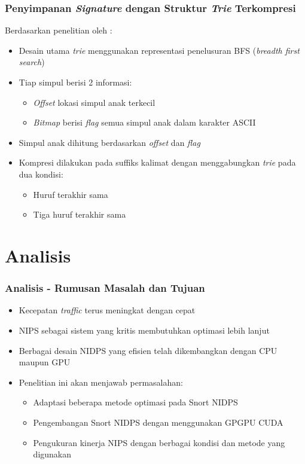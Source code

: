 \documentclass{beamer}
\begin{document}
  \begin{frame}
  \frametitle{Penyimpanan \emph{Signature} dengan Struktur \emph{Trie} Terkompresi}
    Berdasarkan penelitian oleh \cite{bellekens2014}:
    \begin{itemize}
      \item Desain utama \emph{trie} menggunakan representasi penelusuran BFS (\emph{breadth first search})
      \item Tiap simpul berisi 2 informasi:
      \begin{itemize}
        \item \emph{Offset} lokasi simpul anak terkecil
        \item \emph{Bitmap} berisi \emph{flag} semua simpul anak dalam karakter ASCII
      \end{itemize}
      \item Simpul anak dihitung berdasarkan \emph{offset} dan \emph{flag}
      \item Kompresi dilakukan pada suffiks kalimat dengan menggabungkan \emph{trie} pada dua kondisi:
      \begin{itemize}
        \item Huruf terakhir sama
        \item Tiga huruf terakhir sama
      \end{itemize}
    \end{itemize}
  \end{frame}

\section{Analisis}

\begin{frame}
\frametitle{Analisis - Rumusan Masalah dan Tujuan}
\begin{itemize}
  \item Kecepatan \emph{traffic} terus meningkat dengan cepat
  \item NIPS sebagai sistem yang kritis membutuhkan optimasi lebih lanjut
  \item Berbagai desain NIDPS yang efisien telah dikembangkan dengan CPU maupun GPU
  \item Penelitian ini akan menjawab permasalahan:
  \begin{itemize}
    \item Adaptasi beberapa metode optimasi pada Snort NIDPS
    \item Pengembangan Snort NIDPS dengan menggunakan GPGPU CUDA
    \item Pengukuran kinerja NIPS dengan berbagai kondisi dan metode yang digunakan
  \end{itemize}
\end{itemize}
\end{frame}
\end{document}
